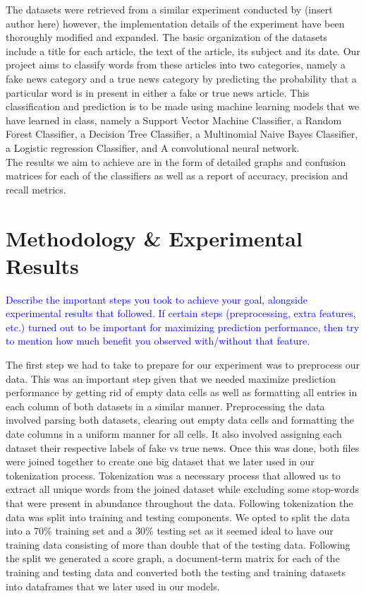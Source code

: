 \documentclass[10pt,twocolumn,letterpaper]{article}
\begin{document}
The datasets were retrieved from a similar experiment conducted by (insert author here) however, the implementation details of the experiment have been thoroughly modified and expanded. The basic organization of the datasets include a title for each article, the text of the article, its subject and its date. Our project aims to classify words from these articles into two categories, namely a fake news category and a true news category by predicting the probability that a particular word is in present in either a fake or true news article. This classification and prediction is to be made using machine learning models that we have learned in class, namely a Support Vector Machine Classifier, a Random Forest Classifier, a Decision Tree Classifier, a Multinomial Naive Bayes Classifier, a Logistic regression Classifier, and A convolutional neural network. \\

The results we aim to achieve are in the form of detailed graphs and confusion matrices for each of the classifiers as well as a report of accuracy, precision and recall metrics. 


\section{Methodology \& Experimental Results}

\textcolor{blue}{Describe the important steps you took to achieve your goal, alongside experimental results that followed. If certain steps (preprocessing, extra features, etc.) turned out to be important for maximizing prediction performance, then try to mention how much benefit you observed with/without that feature.}

The first step we had to take to prepare for our experiment was to preprocess our data. This was an important step given that we needed maximize prediction performance by getting rid of empty data cells as well as formatting all entries in each column of both datasets in a similar manner. Preprocessing the data involved parsing both datasets, clearing out empty data cells and formatting the date columns in a uniform manner for all cells. It also involved assigning each dataset their respective labels of fake vs true news. Once this was done, both files were joined together to create one big dataset that we later used in our tokenization process. Tokenization was a necessary process that allowed us to extract all unique words from the joined dataset while excluding some stop-words that were present in abundance throughout the data. Following tokenization the data was split into training and testing components. We opted to split the data into a 70\% training set and a 30\% testing set as it seemed ideal to have our training data consisting of more than double that of the testing data. Following the split we generated a score graph, a document-term matrix for each of the training and testing data and converted both the testing and training datasets into dataframes that we later used in our models. \\
\end{document}
